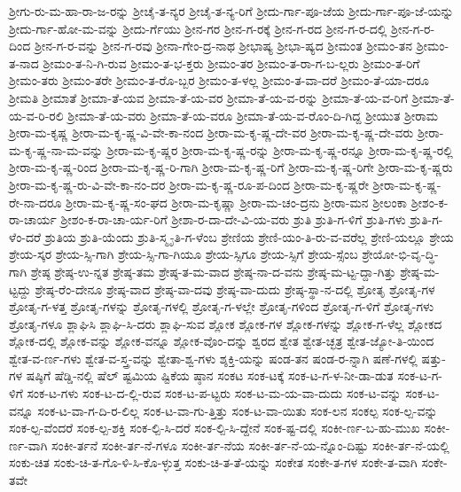 {ಶ್ರೀಗು-ರು-ಮ-ಹಾ-ರಾ-ಜ-ರನ್ನು
ಶ್ರೀಚೈ-ತ-ನ್ಯರ
ಶ್ರೀಚೈ-ತ-ನ್ಯ-ರಿಗೆ
ಶ್ರೀದು-ರ್ಗಾ-ಪೂ-ಜೆಯ
ಶ್ರೀದು-ರ್ಗಾ-ಪೂ-ಜೆ-ಯನ್ನು
ಶ್ರೀದು-ರ್ಗಾ-ಹೋ-ಮ-ವನ್ನು
ಶ್ರೀದು-ರ್ಗೆಯು
ಶ್ರೀನ-ಗರ
ಶ್ರೀನ-ಗ-ರಕ್ಕೆ
ಶ್ರೀನ-ಗ-ರದ
ಶ್ರೀನ-ಗ-ರ-ದಲ್ಲಿ
ಶ್ರೀನ-ಗ-ರ-ದಿಂದ
ಶ್ರೀನ-ಗ-ರ-ವನ್ನು
ಶ್ರೀನ-ಗ-ರವು
ಶ್ರೀನಾ-ಗೇಂ-ದ್ರ-ನಾಥ
ಶ್ರೀಭಾಷ್ಯ
ಶ್ರೀಭಾ-ಷ್ಯದ
ಶ್ರೀಮಂತ
ಶ್ರೀಮಂ-ತನ
ಶ್ರೀಮಂ-ತ-ನಾದ
ಶ್ರೀಮಂ-ತ-ನಿ-ಗಿ-ರುವ
ಶ್ರೀಮಂ-ತ-ಭ-ಕ್ತರು
ಶ್ರೀಮಂ-ತರ
ಶ್ರೀಮಂ-ತ-ರಾ-ಗ-ಬ-ಲ್ಲರು
ಶ್ರೀಮಂ-ತ-ರಿಗೆ
ಶ್ರೀಮಂ-ತರು
ಶ್ರೀಮಂ-ತರೇ
ಶ್ರೀಮಂ-ತ-ರೊ-ಬ್ಬರ
ಶ್ರೀಮಂ-ತ-ಳಲ್ಲ
ಶ್ರೀಮಂ-ತ-ವಾ-ದರೆ
ಶ್ರೀಮಂ-ತೆ-ಯಾ-ದರೂ
ಶ್ರೀಮತಿ
ಶ್ರೀಮಾತೆ
ಶ್ರೀಮಾ-ತೆ-ಯವ
ಶ್ರೀಮಾ-ತೆ-ಯ-ವರ
ಶ್ರೀಮಾ-ತೆ-ಯ-ವ-ರನ್ನು
ಶ್ರೀಮಾ-ತೆ-ಯ-ವ-ರಿಗೆ
ಶ್ರೀಮಾ-ತೆ-ಯ-ವ-ರಿ-ರಲಿ
ಶ್ರೀಮಾ-ತೆ-ಯ-ವರು
ಶ್ರೀಮಾ-ತೆ-ಯ-ವರೂ
ಶ್ರೀಮಾ-ತೆ-ಯ-ವ-ರೊಂ-ದಿ-ಗಿದ್ದ
ಶ್ರೀಯುತ
ಶ್ರೀರಾಮ
ಶ್ರೀರಾ-ಮ-ಕೃಷ್ಣ
ಶ್ರೀರಾ-ಮ-ಕೃ-ಷ್ಣ-ವಿ-ವೇ-ಕಾ-ನಂದ
ಶ್ರೀರಾ-ಮ-ಕೃ-ಷ್ಣ-ದೇ-ವರ
ಶ್ರೀರಾ-ಮ-ಕೃ-ಷ್ಣ-ದೇ-ವರು
ಶ್ರೀರಾ-ಮ-ಕೃ-ಷ್ಣ-ನಾ-ಮ-ವನ್ನು
ಶ್ರೀರಾ-ಮ-ಕೃ-ಷ್ಣರ
ಶ್ರೀರಾ-ಮ-ಕೃ-ಷ್ಣ-ರನ್ನು
ಶ್ರೀರಾ-ಮ-ಕೃ-ಷ್ಣ-ರನ್ನೂ
ಶ್ರೀರಾ-ಮ-ಕೃ-ಷ್ಣ-ರಲ್ಲಿ
ಶ್ರೀರಾ-ಮ-ಕೃ-ಷ್ಣ-ರಿಂದ
ಶ್ರೀರಾ-ಮ-ಕೃ-ಷ್ಣ-ರಿ-ಗಾಗಿ
ಶ್ರೀರಾ-ಮ-ಕೃ-ಷ್ಣ-ರಿಗೆ
ಶ್ರೀರಾ-ಮ-ಕೃ-ಷ್ಣ-ರಿಗೇ
ಶ್ರೀರಾ-ಮ-ಕೃ-ಷ್ಣರು
ಶ್ರೀರಾ-ಮ-ಕೃ-ಷ್ಣ-ರು-ವಿ-ವೇ-ಕಾ-ನಂ-ದರ
ಶ್ರೀರಾ-ಮ-ಕೃ-ಷ್ಣ-ರೂ-ಪ-ದಿಂದ
ಶ್ರೀರಾ-ಮ-ಕೃ-ಷ್ಣರೇ
ಶ್ರೀರಾ-ಮ-ಕೃ-ಷ್ಣ-ರೇ-ನಾ-ದರೂ
ಶ್ರೀರಾ-ಮ-ಕೃ-ಷ್ಣ-ಸಂ-ಘದ
ಶ್ರೀರಾ-ಮ-ಕೃಷ್ಣಾ
ಶ್ರೀರಾ-ಮ-ಚಂ-ದ್ರನು
ಶ್ರೀರಾ-ಮನ
ಶ್ರೀಲಂಕಾ
ಶ್ರೀಶಂ-ಕ-ರಾ-ಚಾರ್ಯ
ಶ್ರೀಶಂ-ಕ-ರಾ-ಚಾ-ರ್ಯ-ರಿಗೆ
ಶ್ರೀಶಾ-ರ-ದಾ-ದೇ-ವಿ-ಯ-ವರು
ಶ್ರುತಿ
ಶ್ರುತಿ-ಗ-ಳಿಗೆ
ಶ್ರುತಿ-ಗಳು
ಶ್ರುತಿ-ಗ-ಳೆಂ-ದರೆ
ಶ್ರುತಿಯ
ಶ್ರುತಿ-ಯೆಂದು
ಶ್ರುತಿ-ಸ್ಮೃ-ತಿ-ಗ-ಳೆಂಬ
ಶ್ರೇಣಿಯ
ಶ್ರೇಣಿ-ಯಂ-ತಿ-ರು-ವ-ವರೆಲ್ಲ
ಶ್ರೇಣಿ-ಯಲ್ಲೂ
ಶ್ರೇಯ
ಶ್ರೇಯ-ಸ್ಕರ
ಶ್ರೇಯ-ಸ್ಸಿ-ಗಾಗಿ
ಶ್ರೇಯ-ಸ್ಸಿ-ಗಾ-ಗಿಯೂ
ಶ್ರೇಯ-ಸ್ಸಿಗೂ
ಶ್ರೇಯ-ಸ್ಸಿಗೆ
ಶ್ರೇಯ-ಸ್ಸೆಂಬ
ಶ್ರೇಯೋ-ಭಿ-ವೃ-ದ್ಧಿ-ಗಾಗಿ
ಶ್ರೇಷ್ಠ
ಶ್ರೇಷ್ಠ-ಉ-ನ್ನತ
ಶ್ರೇಷ್ಠ-ತಮ
ಶ್ರೇಷ್ಠ-ತ-ಮ-ವಾದ
ಶ್ರೇಷ್ಠ-ನಾ-ದ-ವನು
ಶ್ರೇಷ್ಠ-ಮ-ಟ್ಟ-ದ್ದಾ-ಗಿತ್ತು
ಶ್ರೇಷ್ಠ-ಮ-ಟ್ಟದ್ದು
ಶ್ರೇಷ್ಠ-ರೆಂ-ದೇನೂ
ಶ್ರೇಷ್ಠ-ವಾದ
ಶ್ರೇಷ್ಠ-ವಾ-ದವು
ಶ್ರೇಷ್ಠ-ವಾ-ದುದು
ಶ್ರೇಷ್ಠ-ಸ್ಥಾ-ನ-ದಲ್ಲಿ
ಶ್ರೋತೃ
ಶ್ರೋತೃ-ಗಳ
ಶ್ರೋತೃ-ಗ-ಳತ್ತ
ಶ್ರೋತೃ-ಗಳನ್ನು
ಶ್ರೋತೃ-ಗಳಲ್ಲಿ
ಶ್ರೋತೃ-ಗ-ಳಲ್ಲೇ
ಶ್ರೋತೃ-ಗಳಿಂದ
ಶ್ರೋತೃ-ಗ-ಳಿಗೆ
ಶ್ರೋತೃ-ಗಳು
ಶ್ರೋತೃ-ಗಳೂ
ಶ್ಲಾಘಿಸಿ
ಶ್ಲಾಘಿ-ಸಿ-ದರು
ಶ್ಲಾಘಿ-ಸುವ
ಶ್ಲೋಕ
ಶ್ಲೋಕ-ಗಳ
ಶ್ಲೋಕ-ಗಳನ್ನು
ಶ್ಲೋಕ-ಗ-ಳೆಲ್ಲ
ಶ್ಲೋಕದ
ಶ್ಲೋಕ-ದಲ್ಲಿ
ಶ್ಲೋಕ-ವನ್ನು
ಶ್ಲೋಕ-ವನ್ನೂ
ಶ್ಲೋಕ-ವೊಂ-ದನ್ನು
ಶ್ವರದ
ಶ್ವೇತ
ಶ್ವೇತ-ಚ್ಛತ್ರ
ಶ್ವೇತ-ಜ್ಯೋ-ತಿ-ಯಿಂದ
ಶ್ವೇತ-ವ-ರ್ಣ-ಗಳು
ಶ್ವೇತ-ವ-ಸ್ತ್ರ-ವನ್ನು
ಶ್ವೇತಾ-ಶ್ವ-ಗಳು
ಶ್ಶಕ್ತಿ-ಯನ್ನು
ಷಂಡ-ತನ
ಷಂಡ-ರ-ನ್ನಾಗಿ
ಷಣೆ-ಗಳಲ್ಲಿ
ಷತ್ತು-ಗಳ
ಷಷ್ಠಿಗೆ
ಷೆಡ್ಡಿ-ನಲ್ಲಿ
ಷೆಲ್
ಷ್ಟಮಿಯ
ಷ್ಟಿಕೆಯ
ಷ್ಠಾನ
ಸಂಕಟ
ಸಂಕ-ಟಕ್ಕೆ
ಸಂಕ-ಟ-ಗ-ಳ-ನೀ-ಡಾ-ಡುತ
ಸಂಕ-ಟ-ಗ-ಳಿಗೆ
ಸಂಕ-ಟ-ಗಳು
ಸಂಕ-ಟ-ದ-ಲ್ಲಿ-ರುವ
ಸಂಕ-ಟ-ಪ-ಟ್ಟರು
ಸಂಕ-ಟ-ಮ-ಯ-ವಾ-ದುದು
ಸಂಕ-ಟ-ವನ್ನು
ಸಂಕ-ಟ-ವನ್ನೂ
ಸಂಕ-ಟ-ವಾ-ಗ-ದಿ-ರ-ಲಿಲ್ಲ
ಸಂಕ-ಟ-ವಾ-ಗು-ತ್ತಿತ್ತು
ಸಂಕ-ಟ-ವಾ-ಯಿತು
ಸಂಕ-ಲನ
ಸಂಕಲ್ಪ
ಸಂಕ-ಲ್ಪ-ವನ್ನು
ಸಂಕ-ಲ್ಪ-ವೆಂದರೆ
ಸಂಕ-ಲ್ಪ-ಶಕ್ತಿ
ಸಂಕ-ಲ್ಪಿ-ಸಿ-ದರೆ
ಸಂಕ-ಲ್ಪಿ-ಸಿ-ದ್ದೇನೆ
ಸಂಕ-ಷ್ಟ-ದಲ್ಲಿ
ಸಂಕೀ-ರ್ಣ-ಬ-ಹು-ಮುಖ
ಸಂಕೀ-ರ್ಣ-ವಾಗಿ
ಸಂಕೀ-ರ್ತನೆ
ಸಂಕೀ-ರ್ತ-ನೆ-ಗಳೂ
ಸಂಕೀ-ರ್ತ-ನೆಯ
ಸಂಕೀ-ರ್ತ-ನೆ-ಯ-ನ್ನೊಂ-ದಿಷ್ಟು
ಸಂಕೀ-ರ್ತ-ನೆ-ಯಲ್ಲಿ
ಸಂಕು-ಚಿತ
ಸಂಕು-ಚಿ-ತ-ಗೊ-ಳಿ-ಸಿ-ಕೊ-ಳ್ಳುತ್ತ
ಸಂಕು-ಚಿ-ತ-ತೆ-ಯನ್ನು
ಸಂಕೇತ
ಸಂಕೇ-ತ-ಗಳ
ಸಂಕೇ-ತ-ವಾಗಿ
ಸಂಕೇ-ತವೇ
}
